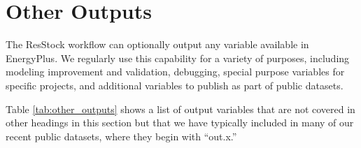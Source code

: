 \section{Other Outputs}
The ResStock workflow can optionally output any variable available in EnergyPlus. We regularly use this capability for a variety of purposes, including modeling improvement and validation, debugging, special purpose variables for specific projects, and additional variables to publish as part of public datasets. 

Table \ref{tab:other_outputs} shows a list of output variables that are not covered in other headings in this section but that we have typically included in many of our recent public datasets, where they begin with ``out.x.''

